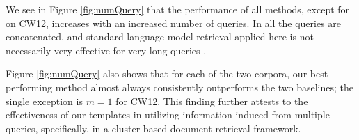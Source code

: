 We see in Figure \ref{fig:numQuery} that the performance of all
methods, except for \queryCat on CW12, increases with an increased
number of queries. In \queryCat all the queries are concatenated, and
standard language model retrieval applied here is not necessarily very
effective for very long queries \cite{Gupta+Bendersky:15a}.

Figure \ref{fig:numQuery} also shows that for each of the two corpora,
our best performing method almost always consistently outperforms the two baselines; the single exception is $m=1$ for CW12. This finding further attests to the effectiveness of our templates in utilizing information induced from multiple queries, specifically, in a cluster-based document retrieval framework.


%

%




